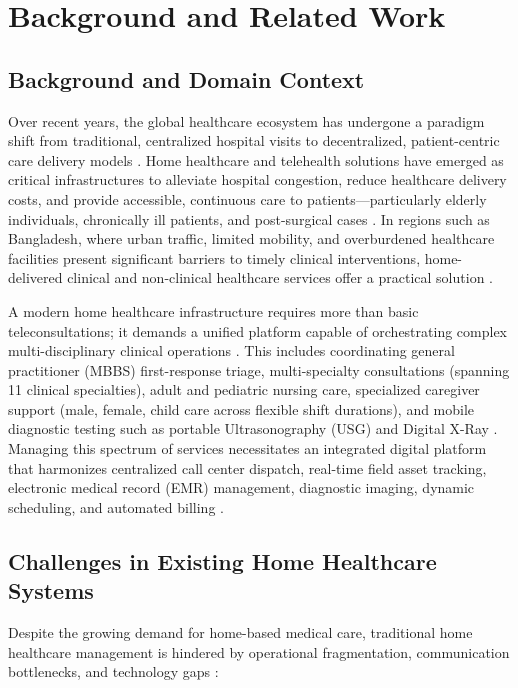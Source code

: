 \documentclass[lettersize,onecolumn,journal]{IEEEtran}
\begin{document}
	\section{Background and Related Work}
	
	\subsection{Background and Domain Context}
	Over recent years, the global healthcare ecosystem has undergone a paradigm shift from traditional, centralized hospital visits to decentralized, patient-centric care delivery models \cite{telemedicine_homecare}. Home healthcare and telehealth solutions have emerged as critical infrastructures to alleviate hospital congestion, reduce healthcare delivery costs, and provide accessible, continuous care to patients—particularly elderly individuals, chronically ill patients, and post-surgical cases \cite{telemedicine_homecare}. In regions such as Bangladesh, where urban traffic, limited mobility, and overburdened healthcare facilities present significant barriers to timely clinical interventions, home-delivered clinical and non-clinical healthcare services offer a practical solution \cite{srs2026}.
	
	A modern home healthcare infrastructure requires more than basic teleconsultations; it demands a unified platform capable of orchestrating complex multi-disciplinary clinical operations \cite{srs2026}. This includes coordinating general practitioner (MBBS) first-response triage, multi-specialty consultations (spanning 11 clinical specialties), adult and pediatric nursing care, specialized caregiver support (male, female, child care across flexible shift durations), and mobile diagnostic testing such as portable Ultrasonography (USG) and Digital X-Ray \cite{srs2026}. Managing this spectrum of services necessitates an integrated digital platform that harmonizes centralized call center dispatch, real-time field asset tracking, electronic medical record (EMR) management, diagnostic imaging, dynamic scheduling, and automated billing \cite{srs2026}.
	
	\subsection{Challenges in Existing Home Healthcare Systems}
	Despite the growing demand for home-based medical care, traditional home healthcare management is hindered by operational fragmentation, communication bottlenecks, and technology gaps \cite{telemedicine_homecare}:
	
\end{document}
